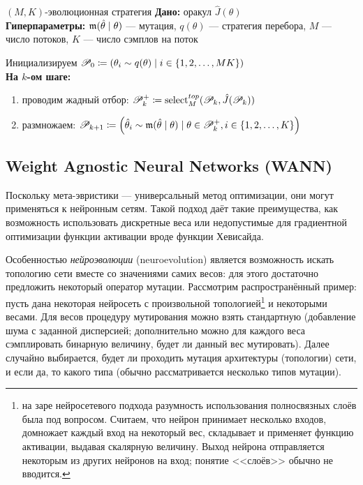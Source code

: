 \begin{algorithm}{$(M, K)$-эволюционная стратегия}
\textbf{Дано:} оракул $\hat{J}(\theta)$ \\
\textbf{Гиперпараметры:} $\mathfrak{m}(\hat{\theta} \mid \theta)$ --- мутация, $q(\theta)$ --- стратегия перебора, $M$ --- число потоков, $K$ --- число сэмплов на поток

\vspace{0.3cm}
Инициализируем $\mathscr{P}_0 \coloneqq \left( \theta_i \sim q(\theta) \mid i \in \{1, 2, \dots , MK \} \right)$ \\
\textbf{На $k$-ом шаге:}
\begin{enumerate}
    \item проводим жадный отбор: $\mathscr{P}^{+}_k \coloneqq \mathrm{select}^{\mathop{top}}_M(\mathscr{P}_k, \hat{J}(\mathscr{P}_k))$
    \item размножаем: $\mathscr{P}_{k+1} \coloneqq \left( \hat{\theta}_i \sim \mathfrak{m}(\hat{\theta} \mid \theta) \mid \theta \in \mathscr{P}^{+}_k, i \in \{1, 2, \dots , K\} \right)$
\end{enumerate}
\end{algorithm}

\begin{example}
\begin{center}
\end{center}
\end{example}

\subsection{Weight Agnostic Neural Networks (WANN)}

Поскольку мета-эвристики --- универсальный метод оптимизации, они могут применяться к нейронным сетям. Такой подход даёт такие преимущества, как возможность использовать дискретные веса или недопустимые для градиентной оптимизации функции активации вроде функции Хевисайда. 

Особенностью \emph{нейроэволюции} (neuroevolution) является возможность искать топологию сети вместе со значениями самих весов: для этого достаточно предложить некоторый оператор мутации. Рассмотрим распространённый пример: пусть дана некоторая нейросеть с произвольной топологией\footnote{на заре нейросетевого подхода разумность использования полносвязных слоёв была под вопросом. Считаем, что нейрон принимает несколько входов, домножает каждый вход на некоторый вес, складывает и применяет функцию активации, выдавая скалярную величину. Выход нейрона отправляется некоторым из других нейронов на вход; понятие <<слоёв>> обычно не вводится.} и некоторыми весами. Для весов процедуру мутирования можно взять стандартную (добавление шума с заданной дисперсией; дополнительно можно для каждого веса сэмплировать бинарную величину, будет ли данный вес мутировать). Далее случайно выбирается, будет ли проходить мутация архитектуры (топологии) сети, и если да, то какого типа (обычно рассматривается несколько типов мутации).

